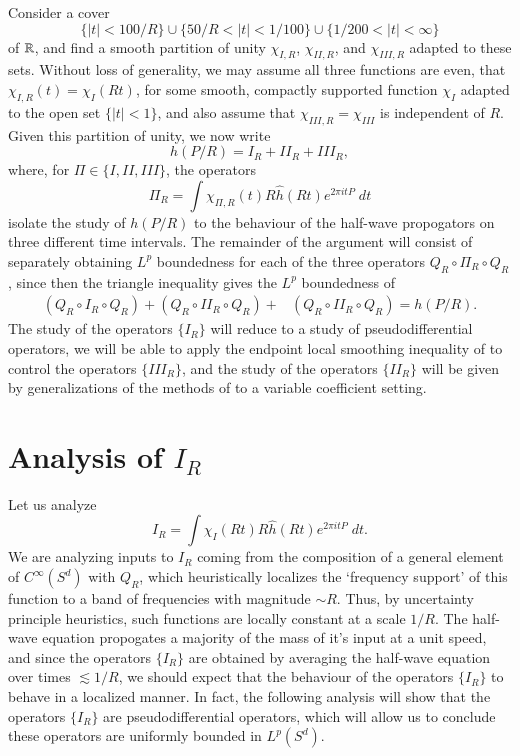 Consider a cover
%
\[ \{ |t| < 100/R \} \cup \{ 50/R < |t| < 1/100 \} \cup \{ 1/200 < |t| < \infty \} \]
%
of $\operatorname{\mathbb{R}}$, and find a smooth partition of unity $\chi_{I,R}$, $\chi_{II,R}$, and $\chi_{III,R}$ adapted to these sets. Without loss of generality, we may assume all three functions are even, that $\chi_{I,R}(t) = \chi_I(Rt)$, for some smooth, compactly supported function $\chi_I$ adapted to the open set $\{ |t| < 1 \}$, and also assume that $\chi_{III,R} = \chi_{III}$ is independent of $R$. Given this partition of unity, we now write
%
\[ h(P/R) = I_R + II_R + III_R, \]
%
where, for $\Pi \in \{ I, II, III \}$, the operators
%
\[ \Pi_R = \int \chi_{\Pi,R}(t) R \widehat{h}(Rt) e^{2 \pi i t P}\; dt \]
%
isolate the study of $h(P/R)$ to the behaviour of the half-wave propogators on three different time intervals. The remainder of the argument will consist of separately obtaining $L^p$ boundedness for each of the three operators $Q_R \circ \Pi_R \circ Q_R$, since then the triangle inequality gives the $L^p$ boundedness of
%
\begin{align*}
    (Q_R \circ I_R \circ Q_R) + (Q_R \circ II_R \circ Q_R) + &(Q_R \circ II_R \circ Q_R) = h(P/R).
\end{align*}
%
The study of the operators $\{ I_R \}$ will reduce to a study of pseudodifferential operators, we will be able to apply the endpoint local smoothing inequality of \cite{LeeSeeger} to control the operators $\{ III_R \}$, and the study of the operators $\{ II_R \}$ will be given by generalizations of the methods of \cite{HeoandNazarovandSeeger} to a variable coefficient setting.




\section{Analysis of $I_R$}

Let us analyze
%
\[ I_R = \int \chi_I(Rt) R \widehat{h}(Rt) e^{2 \pi i t P}\; dt. \]
%
We are analyzing inputs to $I_R$ coming from the composition of a general element of $C^\infty(S^d)$ with $Q_R$, which heuristically localizes the `frequency support' of this function to a band of frequencies with magnitude $\sim R$. Thus, by uncertainty principle heuristics, such functions are locally constant at a scale $1/R$. The half-wave equation propogates a majority of the mass of it's input at a unit speed, and since the operators $\{ I_R \}$ are obtained by averaging the half-wave equation over times $\lesssim 1/R$, we should expect that the behaviour of the operators $\{ I_R \}$ to behave in a localized manner. In fact, the following analysis will show that the operators $\{ I_R \}$ are pseudodifferential operators, which will allow us to conclude these operators are uniformly bounded in $L^p(S^d)$.

